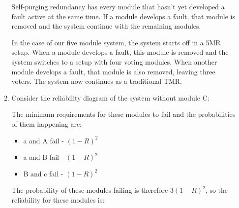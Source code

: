 \documentclass[a4paper,12pt]{article}
\begin{document}
\begin{enumerate}
\begin{enumerate}
                    Self-purging redundancy has every module that hasn't yet developed a fault active at the same time. If a module develops a fault, that module is removed and the system continue with the remaining modules.

                    In the case of our five module system, the system starts off in a 5MR setup. When a module develops a fault, this module is removed and the system switches to a setup with four voting modules. When another module develops a fault, that module is also removed, leaving three voters. The system now continues as a traditional TMR.

                \item Consider the reliability diagram of the system without module C:

                    \begin{center}
                    \end{center}

                    The minimum requirements for these modules to fail and the probabilities of them happening are:
                    \begin{itemize}
                        \item a and A fail - $(1 - R)^2$
                        \item a and B fail - $(1 - R)^2$
                        \item B and c fail - $(1 - R)^2$
                    \end{itemize}
                    The probability of these modules failing is therefore $3(1 - R)^2$, so the reliability for these modules is:


\end{enumerate}
\end{enumerate}
\end{document}
